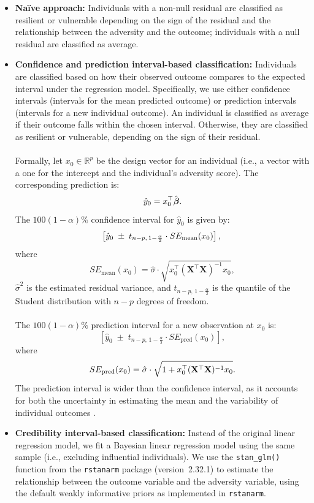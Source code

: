 \documentclass[12pt]{article}
\begin{document}
\begin{itemize}
\item \textbf{Naïve approach:} Individuals with a non-null residual are classified as resilient or vulnerable depending on the sign of the residual and the relationship between the adversity and the outcome; individuals with a null residual are classified as average.

\item \textbf{Confidence and prediction interval-based classification:}  
Individuals are classified based on how their observed outcome compares to the expected interval under the regression model. Specifically, we use either confidence intervals (intervals for the mean predicted outcome) or prediction intervals (intervals for a new individual outcome). An individual is classified as average if their outcome falls within the chosen interval. Otherwise, they are classified as resilient or vulnerable, depending on the sign of their residual.\\
\\
Formally, let \( x_0 \in \mathbb{R}^p \) be the design vector for an individual (i.e., a vector with a one for the intercept and the individual's adversity score). The corresponding prediction is:
\[
\hat y_0 = x_0^\top \hat{\boldsymbol{\beta}}.\\
\]
The \( 100(1 - \alpha)\% \) confidence interval for \(\hat y_0\) is given by:
\[
\left[ \hat y_0 \; \pm \; t_{n-p,\,1 - \frac{\alpha}{2}} \cdot SE_{\text{mean}}(x_0) \right],\\
\]
where
\[
SE_{\text{mean}}(x_0) = \hat{\sigma} \cdot \sqrt{x_0^\top (\mathbf{X}^\top \mathbf{X})^{-1} x_0},
\]
\( \hat{\sigma}^2 \) is the estimated residual variance, and \( t_{n-p,\,1 - \frac{\alpha}{2}} \) is the quantile of the Student distribution with \( n - p \) degrees of freedom.\\
\\
The \( 100(1 - \alpha)\% \) prediction interval for a new observation at \( x_0 \) is:
\[
\left[ \hat y_0 \; \pm \; t_{n-p,\,1 - \frac{\alpha}{2}} \cdot SE_{\text{pred}}(x_0) \right],
\]
where
\[
SE_{\text{pred}}(x_0) = \hat{\sigma} \cdot \sqrt{1 + x_0^\top (\mathbf{X}^\top \mathbf{X})^{-1} x_0}.\\
\]
The prediction interval is wider than the confidence interval, as it accounts for both the uncertainty in estimating the mean and the variability of individual outcomes \cite{confidence_and_prediction_intervals}.

\item \textbf{Credibility interval-based classification:}  
Instead of the original linear regression model, we fit a Bayesian linear regression model using the same sample (i.e., excluding influential individuals). We use the \texttt{stan\_glm()} function from the \texttt{rstanarm} package (version~2.32.1) to estimate the relationship between the outcome variable and the adversity variable, using the default weakly informative priors as implemented in \texttt{rstanarm}.


\end{itemize}
\end{document}
